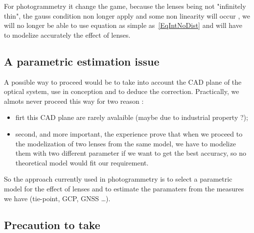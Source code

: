 For photogrammetry it change the game, because the lenses being not "infinitely thin", the gauss
condition non longer apply and some non linearity will occur , we will no longer be able to use
equation as simple as~\ref{EqIntNoDist} and will have to modelize accurately the effect of
lenses. 


\subsection{A parametric estimation issue}

A possible way to proceed would be to take into account the CAD plane of the optical
system, use in conception and to deduce the correction.  Practically, we almots never proceed
this way for two reason  :

\begin{itemize}
   \item firt this CAD plane are rarely avalaible (maybe due to industrial property ?);
   \item second, and more important, the experience prove that when we proceed to the
         modelization of two lenses from the same model, we have to modelize them with two
         different parameter if we want to get the best accuracy, so no theoretical model 
         would fit our requirement.
\end{itemize}

So the approach currently used in photogrammetry is to select a parametric model
for the effect of lenses and to estimate the paramaters from the measures we have  (tie-point,
GCP, GNSS  \dots).


\subsection{Precaution to take}

